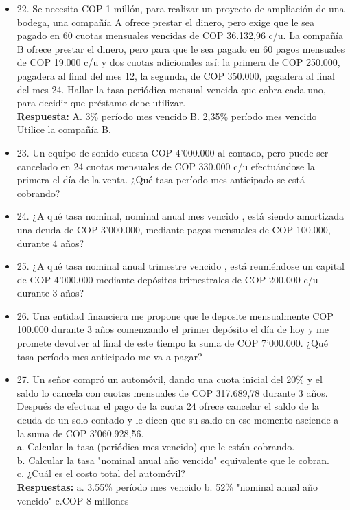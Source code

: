 \begin{itemize}
 \item 22. Se necesita COP 1 millón, para realizar un proyecto de ampliación de una bodega, una compañía A ofrece prestar el dinero, pero exige que le sea pagado en 60 cuotas mensuales vencidas de COP 36.132,96 c/u. La compañía B ofrece prestar el dinero, pero para que le sea pagado en 60 pagos mensuales de COP 19.000 c/u y dos cuotas adicionales así: la primera de COP 250.000, pagadera al final del mes 12, la segunda, de COP 350.000, pagadera al final del mes 24. Hallar la tasa periódica mensual vencida que cobra cada uno, para decidir que préstamo debe utilizar.\\
       \textbf{Respuesta:} A. 3\% período mes vencido  \hspace{0,5 cm}              B. 2,35\% período mes vencido\\
       Utilice la compañía B.\\
       \medskip

 \item 23. Un equipo de sonido cuesta COP 4'000.000 al contado, pero puede ser cancelado en 24 cuotas mensuales de COP 330.000 c/u efectuándose la primera el día de la venta. ¿Qué tasa período mes anticipado se está cobrando?\\
       \medskip

 \item 24. ¿A qué tasa nominal, nominal anual mes vencido , está siendo amortizada una deuda de COP 3'000.000, mediante pagos mensuales de COP 100.000, durante 4 años?\\
       \medskip

 \item 25. ¿A qué tasa nominal anual trimestre vencido , está reuniéndose un capital de COP 4'000.000 mediante depósitos trimestrales de COP 200.000 c/u durante 3 años?\\
       \medskip

 \item 26. Una entidad financiera me propone que le deposite mensualmente COP 100.000 durante 3 años comenzando el primer depósito el día de hoy y me promete devolver al final de este tiempo la suma de COP 7'000.000. ¿Qué tasa período mes anticipado me va a pagar?\\
       \medskip

 \item 27. Un señor compró un automóvil, dando una cuota inicial del 20\% y el saldo lo cancela con cuotas mensuales de COP 317.689,78 durante 3 años. Después de efectuar el pago de la cuota 24 ofrece cancelar el saldo de la deuda de un solo contado y le dicen que su saldo en ese momento asciende a la suma de COP 3'060.928,56.\\
       a. Calcular la tasa (periódica mes vencido) que le están cobrando.\\
       b. Calcular la tasa "nominal anual año vencido" equivalente que le cobran.\\
       c. ¿Cuál es el costo total del automóvil?\\
       \textbf{Respuestas:} a. 3.55\% período mes vencido  \hspace{0,5cm} b. 52\% "nominal anual año vencido"  \hspace{0,5cm} c.COP 8 millones


\end{itemize}
